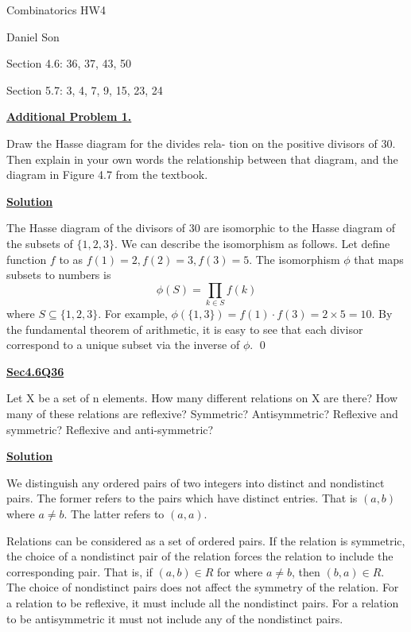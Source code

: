 \documentclass{article}
\newcommand{\new}[1]{
    \vspace{2mm}
    \noindent
    \textbf{
    \underline{#1}}
}
\newcommand{\m}{
    \cdot
}
\begin{document}
\begin{center}
\LARGE
Combinatorics HW4

\Large
Daniel Son
\end{center}


Section 4.6: 36, 37, 43, 50

Section 5.7: 3, 4, 7, 9, 15, 23, 24


\new{Additional Problem 1.}
 Draw the Hasse diagram for the divides rela-
tion on the positive divisors of 30. Then explain in your own words the
relationship between that diagram, and the diagram in Figure 4.7 from
the textbook.

\new{Solution}

\begin{center}
\end{center}

The Hasse diagram of the divisors of 30 are isomorphic to the 
Hasse diagram of the subsets of $\{1, 2, 3\}$. We can describe the 
isomorphism as follows. Let define function $f$ to as $f(1) = 2, 
f(2) = 3, f(3) = 5$. The isomorphism $\phi$ that maps subsets 
to numbers is
\[
    \phi(S) = \prod_{k \in S} f(k) 
\]
where $S \subseteq \{1,2, 3\}$. For example, 
$\phi(\{1, 3\}) = f(1)\m f(3) = 2\times 5 = 10$. By the 
fundamental theorem of arithmetic, it is easy to see that 
each divisor correspond to a unique subset via the inverse of 
$\phi$. \hfill \qed

\new{Sec4.6Q36} 
Let X be a set of n elements. How many different relations on X are there? How 
many of these relations are reflexive? Symmetric? Antisymmetric? Reflexive 
and symmetric? Reflexive and anti-symmetric?

\new{Solution}

We distinguish any ordered pairs of two integers into distinct 
and nondistinct pairs. The former refers to the pairs 
which have distinct entries. That is $(a, b)$ where $a \neq b$. 
The latter refers to $(a, a)$. 

Relations can be considered as a set of ordered pairs. If the 
relation is symmetric, the choice of a nondistinct pair of the 
relation forces the relation to include the corresponding pair. 
That is, if $(a, b) \in R$ for where $a \neq b$, then $(b, a) \in R$. 
The choice of nondistinct pairs does not affect the symmetry of 
the relation. For a relation to be reflexive, it must include 
all the nondistinct pairs. For a relation to be antisymmetric 
it must not include any of the nondistinct pairs. 
\end{document}
